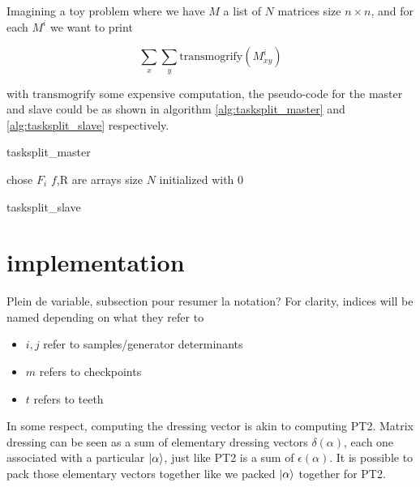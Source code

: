 \documentclass[./thesis.tex]{subfiles}
\begin{document}
Imagining a toy problem where we have $M$ a list of $N$ matrices size $n \times n$, and for each $M^i$ we want to print

\begin{equation}
\sum_{x} \sum_y \text{transmogrify}(M^i_{xy})
\end{equation}

with $\text{transmogrify}$ some expensive computation, the pseudo-code for the master and slave could be as shown in algorithm \ref{alg:tasksplit_master} and \ref{alg:tasksplit_slave} respectively.


\begin{algorithm}
	\label{alg:tasksplit_master}
	\caption{tasksplit\_master}
	chose $F_i$ \;
	$f$,$\text{R}$ are arrays size $N$ initialized with $0$ \;
\end{algorithm}

\begin{algorithm}
	\label{alg:tasksplit_slave}
	\caption{tasksplit\_slave}
\end{algorithm}

\section{implementation}
Plein de variable, subsection pour resumer la notation?
For clarity, indices will be named depending on what they refer to
\begin{itemize}
\item
$i,j$ refer to samples/generator determinants
\item
$m$ refers to checkpoints
\item
$t$ refers to teeth
\end{itemize}

In some respect, computing the dressing vector is akin to computing PT2. Matrix dressing can be seen as a sum of elementary dressing vectors $\delta(\alpha)$, each one associated with a particular $\ket \alpha$, just like PT2 is a sum of $\epsilon(\alpha)$. It is possible to pack those elementary vectors together like we packed $\ket \alpha$ together for PT2.
\end{document}
